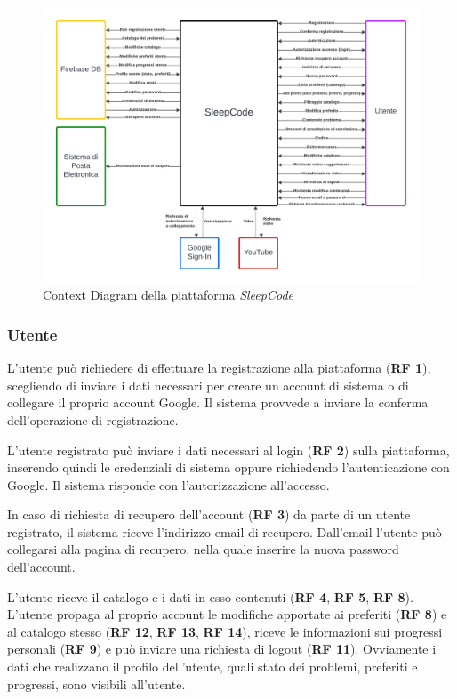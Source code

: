 \documentclass[11pt, a4paper]{article}
\theoremstyle{definition} %
\begin{document}
\begin{figure}[H]
\centering
\hspace*{-2.6cm}
\includegraphics[scale=0.65]{materiale/contextdiagram.pdf}
\caption{Context Diagram della piattaforma \textit{SleepCode}}
\label{contextdiagram}
\end{figure}

\subsubsection*{Utente}
L'utente può richiedere di effettuare la registrazione alla piattaforma
(\textbf{RF 1}), scegliendo di inviare i dati necessari per creare un
account di sistema o di collegare il proprio account Google. Il sistema
provvede a inviare la conferma dell'operazione di registrazione.

L'utente registrato può inviare i dati necessari al login (\textbf{RF 2}) sulla piattaforma,
inserendo quindi le credenziali di sistema oppure richiedendo l'autenticazione
con Google. Il sistema risponde con l'autorizzazione all'accesso.

In caso di richiesta di recupero dell'account (\textbf{RF 3}) da parte di un utente
registrato, il sistema riceve l'indirizzo email di recupero. Dall'email
l'utente può collegarsi alla pagina di recupero, nella quale inserire la
nuova password dell'account.

L'utente riceve il catalogo e i dati in esso contenuti (\textbf{RF 4}, \textbf{RF 5},
\textbf{RF 8}). L'utente propaga al proprio account le modifiche
apportate ai preferiti (\textbf{RF 8}) e al catalogo stesso (\textbf{RF 12}, \textbf{RF 13}, \textbf{RF 14}), riceve le informazioni sui progressi personali (\textbf{RF 9})
e può inviare una richiesta di logout (\textbf{RF 11}). Ovviamente
i dati che realizzano il profilo dell'utente, quali stato dei problemi,
preferiti e progressi, sono visibili all'utente.
\end{document}
